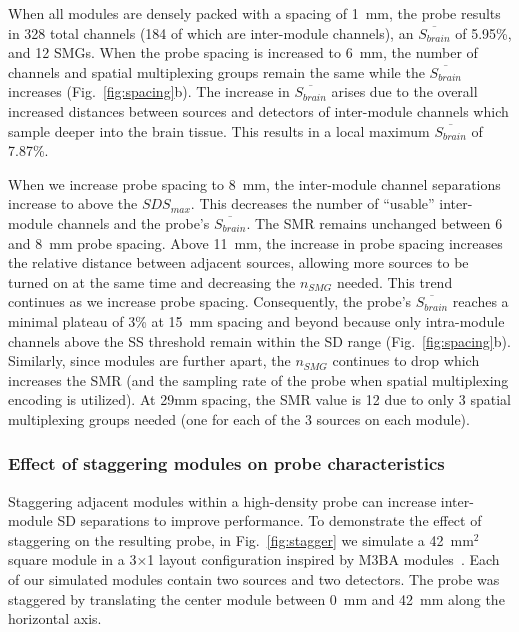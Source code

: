 When all modules are densely packed with a spacing of 1~mm, the probe results in 328 total channels (184 of which are inter-module channels), an $\overline{S_{brain}}$ of 5.95\%, and 12 SMGs. When the probe spacing is increased to 6~mm, the number of channels and spatial multiplexing groups remain the same while the $\overline{S_{brain}}$ increases (Fig.~\ref{fig:spacing}b). The increase in $\overline{S_{brain}}$ arises due to the overall increased distances between sources and detectors of inter-module channels which sample deeper into the brain tissue. This results in a local maximum $\overline{S_{brain}}$ of 7.87\%. 

When we increase probe spacing to 8~mm, the inter-module channel separations increase to above the $SDS_{max}$. This decreases the number of ``usable'' inter-module channels and the probe's $\overline{S_{brain}}$. The SMR remains unchanged between 6 and 8~mm probe spacing. Above 11~mm, the increase in probe spacing increases the relative distance between adjacent sources, allowing more sources to be turned on at the same time and decreasing the $n_{SMG}$ needed. This trend continues as we increase probe spacing. Consequently, the probe's $\overline{S_{brain}}$ reaches a minimal plateau of 3\% at 15~mm spacing and beyond because only intra-module channels above the SS threshold remain within the SD range (Fig.~\ref{fig:spacing}b). Similarly, since modules are further apart, the $n_{SMG}$ continues to drop which increases the SMR (and the sampling rate of the probe when spatial multiplexing encoding is utilized). At 29mm spacing, the SMR value is 12 due to only 3 spatial multiplexing groups needed (one for each of the 3 sources on each module).

\subsubsection{Effect of staggering modules on probe characteristics}
Staggering adjacent modules within a high-density probe can increase inter-module SD separations to improve performance. To demonstrate the effect of staggering on the resulting probe, in Fig.~\ref{fig:stagger} we simulate a 42~$\textrm{mm}^2$ square module in a 3$\times$1 layout configuration inspired by M3BA modules~\cite{Bci2017}. Each of our simulated modules contain two sources and two detectors. The probe was staggered by translating the center module between 0~mm and 42~mm along the horizontal axis.

